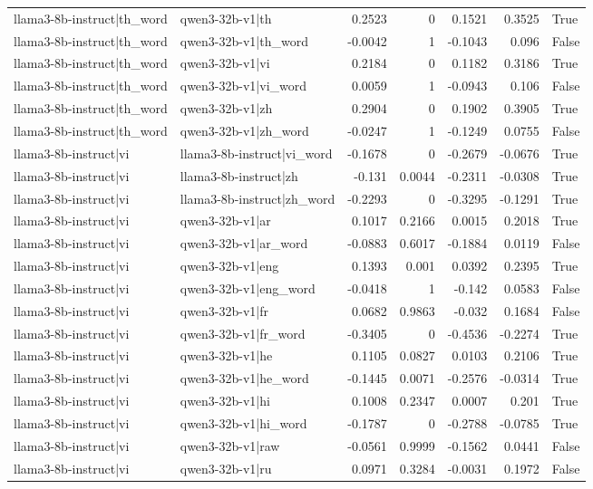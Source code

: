 \begin{table}
\begin{tabular}{l l r r r r l}
llama3-8b-instruct|th_word & qwen3-32b-v1|th & 0.2523 & 0 & 0.1521 & 0.3525 & True \\
llama3-8b-instruct|th_word & qwen3-32b-v1|th_word & -0.0042 & 1 & -0.1043 & 0.096 & False \\
llama3-8b-instruct|th_word & qwen3-32b-v1|vi & 0.2184 & 0 & 0.1182 & 0.3186 & True \\
llama3-8b-instruct|th_word & qwen3-32b-v1|vi_word & 0.0059 & 1 & -0.0943 & 0.106 & False \\
llama3-8b-instruct|th_word & qwen3-32b-v1|zh & 0.2904 & 0 & 0.1902 & 0.3905 & True \\
llama3-8b-instruct|th_word & qwen3-32b-v1|zh_word & -0.0247 & 1 & -0.1249 & 0.0755 & False \\
llama3-8b-instruct|vi & llama3-8b-instruct|vi_word & -0.1678 & 0 & -0.2679 & -0.0676 & True \\
llama3-8b-instruct|vi & llama3-8b-instruct|zh & -0.131 & 0.0044 & -0.2311 & -0.0308 & True \\
llama3-8b-instruct|vi & llama3-8b-instruct|zh_word & -0.2293 & 0 & -0.3295 & -0.1291 & True \\
llama3-8b-instruct|vi & qwen3-32b-v1|ar & 0.1017 & 0.2166 & 0.0015 & 0.2018 & True \\
llama3-8b-instruct|vi & qwen3-32b-v1|ar_word & -0.0883 & 0.6017 & -0.1884 & 0.0119 & False \\
llama3-8b-instruct|vi & qwen3-32b-v1|eng & 0.1393 & 0.001 & 0.0392 & 0.2395 & True \\
llama3-8b-instruct|vi & qwen3-32b-v1|eng_word & -0.0418 & 1 & -0.142 & 0.0583 & False \\
llama3-8b-instruct|vi & qwen3-32b-v1|fr & 0.0682 & 0.9863 & -0.032 & 0.1684 & False \\
llama3-8b-instruct|vi & qwen3-32b-v1|fr_word & -0.3405 & 0 & -0.4536 & -0.2274 & True \\
llama3-8b-instruct|vi & qwen3-32b-v1|he & 0.1105 & 0.0827 & 0.0103 & 0.2106 & True \\
llama3-8b-instruct|vi & qwen3-32b-v1|he_word & -0.1445 & 0.0071 & -0.2576 & -0.0314 & True \\
llama3-8b-instruct|vi & qwen3-32b-v1|hi & 0.1008 & 0.2347 & 0.0007 & 0.201 & True \\
llama3-8b-instruct|vi & qwen3-32b-v1|hi_word & -0.1787 & 0 & -0.2788 & -0.0785 & True \\
llama3-8b-instruct|vi & qwen3-32b-v1|raw & -0.0561 & 0.9999 & -0.1562 & 0.0441 & False \\
llama3-8b-instruct|vi & qwen3-32b-v1|ru & 0.0971 & 0.3284 & -0.0031 & 0.1972 & False \\

\end{tabular}
\end{table}
